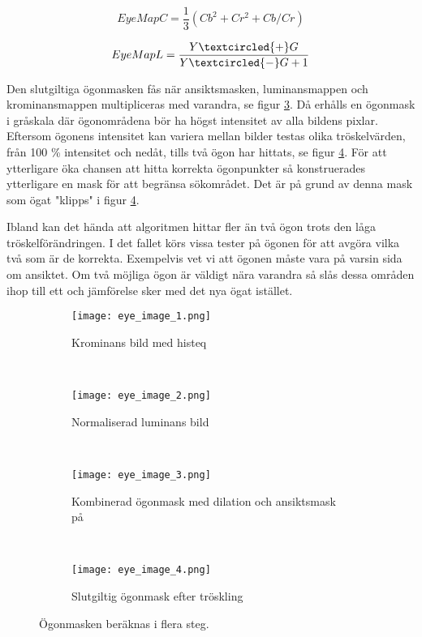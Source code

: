 \documentclass[a4paper,12pt,oneside,final]{extbook}
\begin{document}
\begin{equation} \label{eyemapc}
EyeMapC = \frac{1}{3} (Cb ^ 2 + Cr ^ 2 + Cb / Cr)
\end{equation}

\begin{equation} \label{eyemapl}
EyeMapL = \frac{Y \textcircled{+} G}{Y \textcircled{-} G + 1}
\end{equation}


Den slutgiltiga ögonmasken fås när ansiktsmasken, luminansmappen och krominansmappen multipliceras med varandra, se figur \ref{fig:eye_image_3}. Då erhålls en ögonmask i gråskala där ögonområdena bör ha högst intensitet av alla bildens pixlar. Eftersom ögonens intensitet kan variera mellan bilder testas olika tröskelvärden, från 100 \% intensitet och nedåt, tills två ögon har hittats, se figur \ref{fig:eye_image_4}. För att ytterligare öka chansen att hitta korrekta ögonpunkter så konstruerades ytterligare en mask för att begränsa sökområdet. Det är på grund av denna mask som ögat "klipps" i figur \ref{fig:eye_image_4}.

Ibland kan det hända att algoritmen hittar fler än två ögon trots den låga tröskelförändringen. I det fallet körs vissa tester på ögonen för att avgöra vilka två som är de korrekta. Exempelvis vet vi att ögonen måste vara på varsin sida om ansiktet. Om två möjliga ögon är väldigt nära varandra så slås dessa områden ihop till ett och jämförelse sker med det nya ögat istället.

\begin{figure}[h]
    \centering
    \begin{subfigure}[b]{0.2\textwidth}
        \texttt{[image: eye\_image\_1.png]}
        \caption{Krominans bild med histeq \break}
        \label{fig:eye_image_1}
    \end{subfigure}
    ~ %
    \begin{subfigure}[b]{0.2\textwidth}
        \texttt{[image: eye\_image\_2.png]}
        \caption{Normaliserad luminans bild \break}
        \label{fig:eye_image_2}
    \end{subfigure}
    ~
    \begin{subfigure}[b]{0.2\textwidth}
        \texttt{[image: eye\_image\_3.png]}
        \caption{Kombinerad ögonmask med dilation och ansiktsmask på}
        \label{fig:eye_image_3}
    \end{subfigure}
     ~ %
    \begin{subfigure}[b]{0.2\textwidth}
        \texttt{[image: eye\_image\_4.png]}
        \caption{Slutgiltig ögonmask efter tröskling \break}
        \label{fig:eye_image_4}
    \end{subfigure}
    
    \caption{Ögonmasken beräknas i flera steg.}
    \label{fig:eyemap}
\end{figure}
\end{document}
